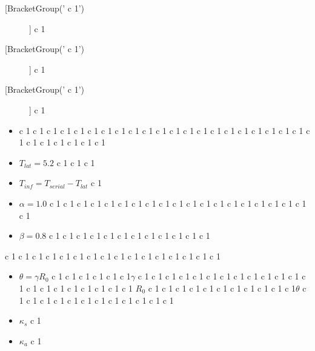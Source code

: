 \documentclass[11pt]{article}
\begin{document}
    \begin{description}
        \item[[BracketGroup(' c 1')]] c 1
\item[[BracketGroup(' c 1')]] c 1
\item[[BracketGroup(' c 1')]] c 1
\end{description}

    \begin{itemize}
	\item c 1  c 1  c 1  c 1  c 1  c 1  c 1  c 1
 c 1  c 1  c 1  c 1  c 1  c 1  c 1  c 1  c 1  c 1  c 1  c 1  c 1  c 1  c 1  c 1  c 1  c 1  c 1  c 1
\item $T_{lat}=5.2$ c 1  c 1  c 1

\item $T_{inf}=T_{serial}-T_{lat}$ c 1
\item $\alpha=1.0$ c 1  c 1  c 1  c 1  c 1  c 1  c 1  c 1  c 1  c 1  c 1  c 1  c 1  c 1  c 1
 c 1  c 1  c 1  c 1  c 1
\item $\beta=0.8$ c 1  c 1  c 1  c 1  c 1  c 1  c 1  c 1  c 1  c 1  c 1  c 1
\end{itemize}

 c 1  c 1  c 1  c 1  c 1  c 1  c 1  c 1  c 1  c 1  c 1  c 1  c 1  c 1  c 1  c 1

\begin{itemize}
   \item $\theta=\gamma R_0$ c 1  c 1  c 1  c 1  c 1  c 1$\gamma$ c 1
 c 1  c 1  c 1  c 1  c 1  c 1  c 1  c 1  c 1  c 1  c 1  c 1  c 1  c 1  c 1  c 1  c 1  c 1  c 1  c 1
$R_0$ c 1  c 1  c 1  c 1  c 1  c 1  c 1  c 1  c 1  c 1  c 1$\theta$ c 1  c 1  c 1  c 1
 c 1  c 1  c 1  c 1  c 1  c 1  c 1  c 1
\item $\kappa _s$ c 1
\item $\kappa _a$ c 1
\end{itemize}
\end{document}
